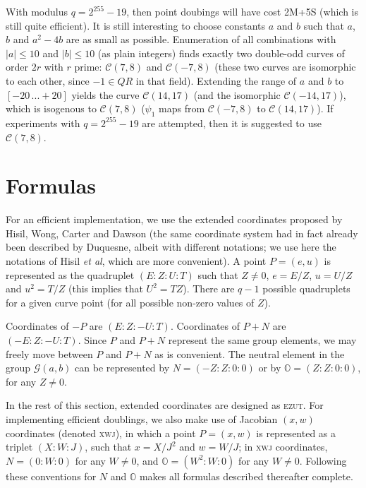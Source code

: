 \documentclass{llncs}
\newcommand{\QR}{QR}
\newcommand{\cC}{\mathcal{C}}
\newcommand{\cG}{\mathcal{G}}
\newcommand{\neutral}{\mathbb{O}}
\newcommand{\ezut}{\textsc{ezut}\xspace}
\newcommand{\xwj}{\textsc{xwj}\xspace}
\begin{document}
With modulus $q = 2^{255}-19$, then point doubings will have cost 2M+5S
(which is still quite efficient). It is still interesting to choose
constants $a$ and $b$ such that $a$, $b$ and $a^2-4b$ are as small as
possible. Enumeration of all combinations with $|a|\leq 10$ and $|b|\leq
10$ (as plain integers) finds exactly two double-odd curves of order
$2r$ with $r$ prime: $\cC(7,8)$ and $\cC(-7,8)$ (these two curves are
isomorphic to each other, since $-1\in\QR$ in that field). Extending the
range of $a$ and $b$ to $[-20\,...+\!20]$ yields the curve $\cC(14,17)$ (and
the isomorphic $\cC(-14,17)$), which is isogenous to $\cC(7,8)$
($\psi_1$ maps from $\cC(-7,8)$ to $\cC(14, 17)$). If experiments with
$q = 2^{255}-19$ are attempted, then it is suggested to use $\cC(7,8)$.


\section{Formulas}\label{sec:formulas}

For an efficient implementation, we use the extended coordinates
proposed by Hisil, Wong, Carter and Dawson\cite{HisWonCarDaw2009} (the
same coordinate system had in fact already been described by
Duquesne\cite{Duq2007}, albeit with different notations; we use here the
notations of Hisil \emph{et al}, which are more convenient). A
point $P = (e,u)$ is represented as the quadruplet $(E{:}Z{:}U{:}T)$
such that $Z\neq 0$, $e = E/Z$, $u = U/Z$ and $u^2 = T/Z$ (this
implies that $U^2 = TZ$). There are $q-1$ possible quadruplets for
a given curve point (for all possible non-zero values of $Z$).

Coordinates of $-P$ are $(E{:}Z{:}-\!U{:}T)$. Coordinates of $P+N$
are $(-E{:}Z{:}-\!U{:}T)$. Since $P$ and $P+N$ represent the same group
elements, we may freely move between $P$ and $P+N$ as is convenient.
The neutral element in the group $\cG(a,b)$ can be represented by
$N = (-Z{:}Z{:}0{:}0)$ or by $\neutral = (Z{:}Z{:}0{:}0)$, for any
$Z\neq 0$.

In the rest of this section, extended coordinates are designed as
\ezut. For implementing efficient doublings, we also make use of
Jacobian $(x,w)$ coordinates (denoted \xwj), in which a point
$P = (x,w)$ is represented as a triplet $(X{:}W{:}J)$, such that
$x = X/J^2$ and $w = W/J$; in \xwj coordinates, $N = (0{:}W{:}0)$
for any $W\neq 0$, and $\neutral = (W^2{:}W{:}0)$ for any $W\neq 0$.
Following these conventions for $N$ and $\neutral$ makes all
formulas described thereafter complete.
\end{document}
